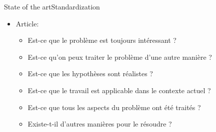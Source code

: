 \begin{frame}{State of the art}{Standardization}
{\begin{itemize}
\begin{itemize}
			\end{itemize}
			\item Article:
			\begin{itemize}
				\item Est-ce que le problème est toujours intéressant ?
				\item Est-ce qu'on peux traiter le problème d'une autre manière ?
				\item Est-ce que les hypothèses sont réalistes ?
				\item Est-ce que le travail est applicable dans le contexte actuel ?
				\item Est-ce que tous les aspects du problème ont été traités ?
				\item Existe-t-il d’autres manières pour le résoudre ?
			\end{itemize}
		\end{itemize}
	}
\end{frame}

